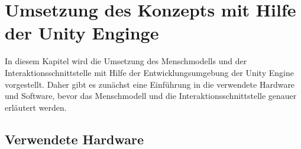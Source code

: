 \chapter{Umsetzung des Konzepts mit Hilfe der Unity Enginge}\label{cha:Umsetzung}
In diesem Kapitel wird die Umsetzung des Menschmodells und der Interaktionsschnittstelle mit Hilfe der Entwicklungsumgebung der Unity Engine vorgestellt. Daher gibt es zunächst eine Einführung in die verwendete Hardware und Software, bevor das Menschmodell und die Interaktionsschnittstelle genauer erläutert werden.
\section{Verwendete Hardware}\label{sec:Hardware}

